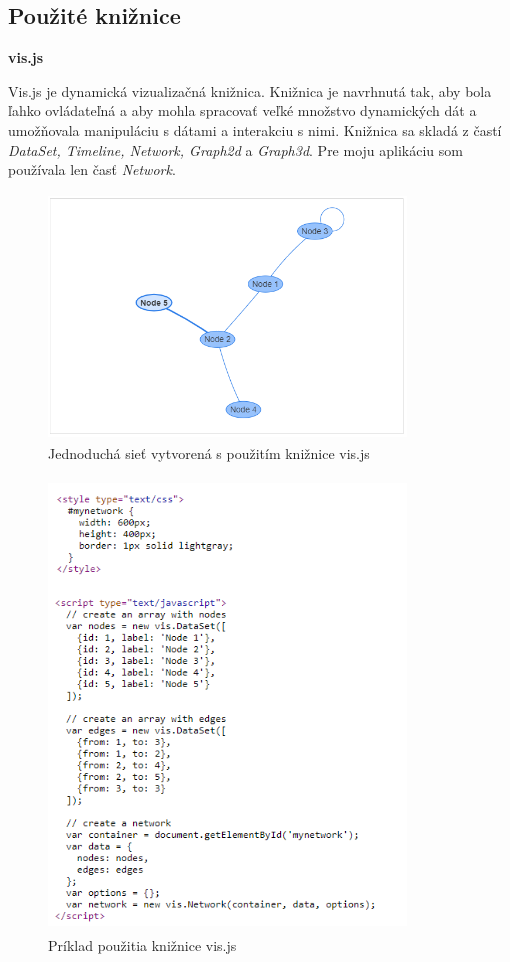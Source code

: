 \documentclass[slovak,master,public,dept460,male,cpdeclaration,oneside]{diploma}
\begin{document}
\subsection{Použité knižnice}


\textbf{vis.js}


\noindent Vis.js je dynamická vizualizačná knižnica. Knižnica je navrhnutá tak, aby bola ľahko ovládateľná a aby mohla spracovať veľké množstvo dynamických dát a umožňovala manipuláciu s dátami a interakciu s nimi. Knižnica sa skladá z častí \textit{DataSet, Timeline, Network, Graph2d} a \textit{Graph3d}.
Pre moju aplikáciu som používala len časť \textit{Network}.

\begin{figure}[H]
\centering
\includegraphics[width=9.5cm, height=6.5cm]{figures/vis_basic_usage}
\caption{Jednoduchá sieť vytvorená s použitím knižnice vis.js}
\end{figure}


\begin{figure}[H]
\centering
\includegraphics[width=9.5cm, height=12cm]{figures/vis_basiccode}
\caption{Príklad použitia knižnice vis.js}
\end{figure}
\end{document}

